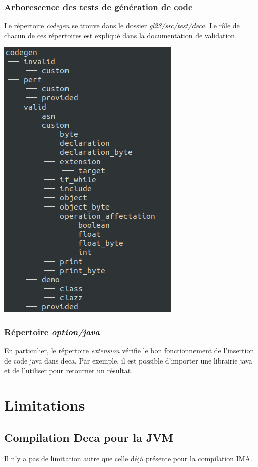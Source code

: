 \documentclass[12pt, a4paper, one side]{article}
\begin{document}
    \subsubsection{Arborescence des tests de génération de code}
    Le répertoire \textit{codegen} se trouve dans le dossier \textit{gl28/src/test/deca}. Le rôle de chacun de ces répertoires est expliqué dans la documentation de validation.
    \begin{center}
        \includegraphics[scale=0.6]{treecodegen.png}
    \end{center}

    \subsubsection{Répertoire \textit{option/java}}
    En particulier, le répertoire \textit{extension} vérifie le bon fonctionnement de l'insertion de code java dans deca. Par exemple, il est possible d'importer une librairie java et de l'utiliser pour retourner un résultat.

    \section{Limitations}
    \subsection{Compilation Deca pour la JVM}
    Il n'y a pas de limitation autre que celle déjà présente pour la compilation IMA.
\end{document}
